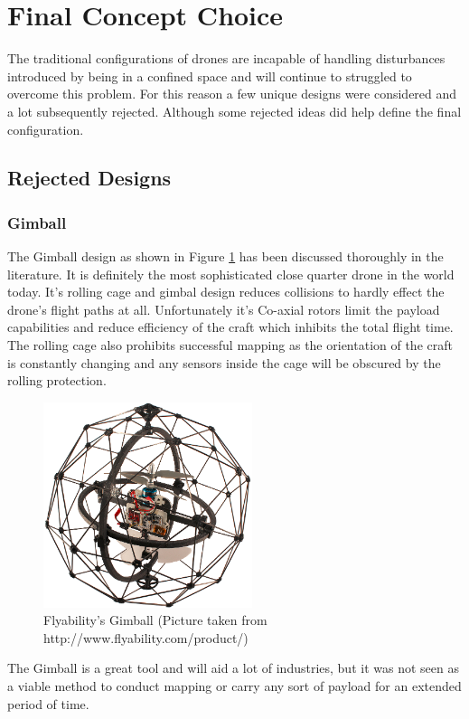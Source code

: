 \section{Final Concept Choice}
The traditional configurations of drones are incapable of handling disturbances introduced by being in a confined space and will continue to struggled to overcome this problem. For this reason a few unique designs were considered and a lot subsequently rejected. Although some rejected ideas did help define the final configuration.

\subsection{Rejected Designs}
\subsubsection{Gimball}
The Gimball design as shown in Figure \ref{IM_Gimball} has been discussed thoroughly in the literature. It is definitely the most sophisticated close quarter drone in the world today. It's rolling cage and gimbal design reduces collisions to hardly effect the drone's flight paths at all. Unfortunately it's Co-axial rotors limit the payload capabilities and reduce efficiency of the craft which inhibits the total flight time. The rolling cage also prohibits successful mapping as the orientation of the craft is constantly changing and any sensors inside the cage will be obscured by the rolling protection.

\begin{figure}[H]
\centering
\includegraphics[height = 6cm]{Images/Design/Gimball}
\caption{Flyability's Gimball (Picture taken from http://www.flyability.com/product/)}
\label{IM_Gimball}
\end{figure}

The Gimball is a great tool and will aid a lot of industries, but it was not seen as a viable method to conduct mapping or carry any sort of payload for an extended period of time.

